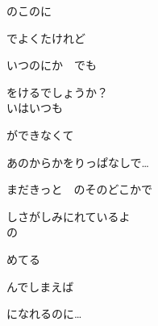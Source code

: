 のこのに

でよくたけれど

いつのにか　でも

をけるでしょうか？
\\

いはいつも

ができなくて

あのからかをりっぱなしで…

まだきっと　のそのどこかで

しさがしみにれているよ
\\

の

めてる

んでしまえば

になれるのに…
\\
